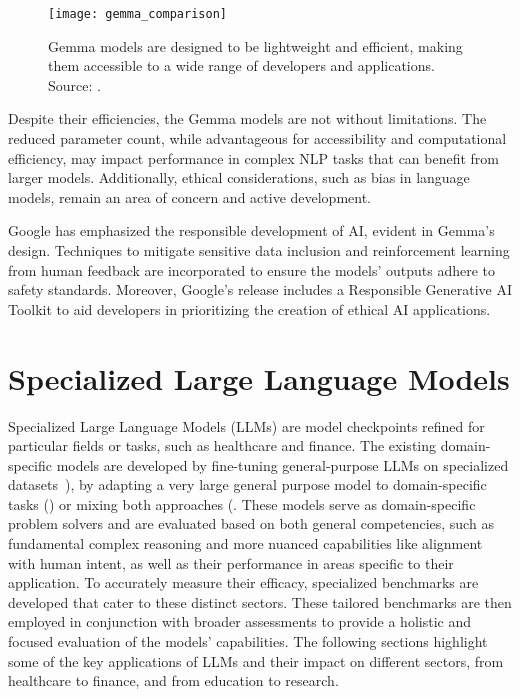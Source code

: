 \begin{figure}[ht!]
	\centering
	\texttt{[image: gemma\_comparison]}
	\caption{Gemma models are designed to be lightweight and efficient, making them accessible to a wide range of developers and applications. Source: \protect\textcite{gemma_google_ai}.}
	\label{fig:gemma-comparison}
\end{figure}

Despite their efficiencies, the Gemma models are not without limitations.
The reduced parameter count, while advantageous for accessibility and computational efficiency, may impact performance in complex NLP tasks that can benefit from larger models.
Additionally, ethical considerations, such as bias in language models, remain an area of concern and active development.

Google has emphasized the responsible development of AI, evident in Gemma's design.
Techniques to mitigate sensitive data inclusion and reinforcement learning from human feedback are incorporated to ensure the models' outputs adhere to safety standards.
Moreover, Google's release includes a Responsible Generative AI Toolkit to aid developers in prioritizing the creation of ethical AI applications.


\section{Specialized Large Language Models}
\label{sec:applications-of-large-language-models}

Specialized Large Language Models (LLMs) are model checkpoints refined for particular fields or tasks, such as healthcare and finance.
The existing domain-specific models are developed by fine-tuning general-purpose LLMs on specialized datasets~\cite{luo2022biogpt,bolton2023biomedlm, taylor2022galactica}), by adapting a very large general purpose model to domain-specific tasks (\textcite{singhal2022large, liang2022holistic}) or mixing both approaches (\textcite{wu2023bloomberggpt}.
These models serve as domain-specific problem solvers and are evaluated based on both general competencies, such as fundamental complex reasoning and more nuanced capabilities like alignment with human intent, as well as their performance in areas specific to their application.
To accurately measure their efficacy, specialized benchmarks are developed that cater to these distinct sectors.
These tailored benchmarks are then employed in conjunction with broader assessments to provide a holistic and focused evaluation of the models' capabilities.
The following sections highlight some of the key applications of LLMs and their impact on different sectors, from healthcare to finance, and from education to research.

